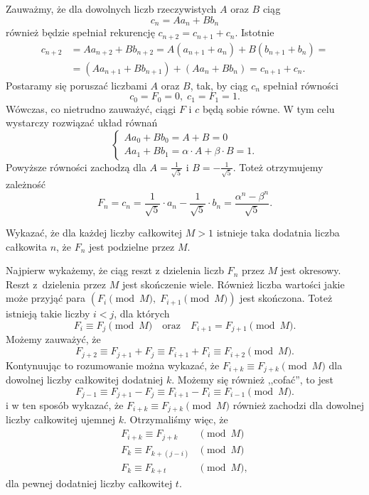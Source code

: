 \vspace{10px}
\noindent
Zauważmy, że dla dowolnych liczb rzeczywistych $A$ oraz $B$ ciąg
\[
	c_n = Aa_n + Bb_n
\]
również będzie spełniał rekurencję $c_{n + 2} = c_{n + 1} + c_n$. Istotnie
\begin{align*}
	c_{n + 2} &= Aa_{n + 2} + Bb_{n + 2} = A(a_{n + 1} + a_n) + B(b_{n + 1} + b_n) = \\
	&= (Aa_{n + 1}  + Bb_{n + 1}) + (Aa_n + Bb_n) = c_{n + 1} + c_n.
\end{align*}
Postaramy się poruszać liczbami $A$ oraz $B$, tak, by ciąg $c_n$ spełniał równości
\[
	c_{0} = F_0 = 0, \; c_{1} = F_1 = 1.
\]
Wówczas, co nietrudno zauważyć, ciągi $F$ i $c$ będą sobie równe. W tym celu wystarczy rozwiązać układ równań
\[
	\begin{cases}
		Aa_0 + Bb_0 = A + B = 0 \\
		Aa_1 + Bb_1 = \alpha \cdot A + \beta \cdot B = 1.
	\end{cases}
\]
Powyższe równości zachodzą dla $A = \frac{1}{\sqrt{5}}$ i $B = -\frac{1}{\sqrt{5}}$. Toteż otrzymujemy zależność
\[
	F_n = c_n = \frac{1}{\sqrt{5}} \cdot a_n - \frac{1}{\sqrt{5}} \cdot b_n = \frac{\alpha^n - \beta^n}{\sqrt{5}}.
\]


\noindent
Wykazać, że dla każdej liczby całkowitej $M > 1$ istnieje taka dodatnia liczba całkowita $n$, że $F_n$ jest podzielne przez $M$.

\vspace{5px}


\noindent
Najpierw wykażemy, że ciąg reszt z dzielenia liczb $F_n$ przez $M$ jest okresowy. Reszt z~dzielenia przez $M$ jest skończenie wiele. Również liczba wartości jakie może przyjąć para $(F_i \pmod{M},\; F_{i + 1}\pmod{M})$ jest skończona. Toteż istnieją takie liczby $i < j$, dla których
\[
	F_i \equiv F_j \pmod{M} \quad \text{oraz} \quad F_{i + 1} = F_{j + 1} \pmod{M}.
\]
Możemy zauważyć, że
\[
	F_{j + 2} \equiv F_{j + 1} + F_j \equiv F_{i + 1} + F_i \equiv F_{i + 2} \pmod{M}.
\]
Kontynuując to rozumowanie można wykazać, że $F_{i + k} \equiv F_{j + k} \pmod{M}$ dla dowolnej liczby całkowitej dodatniej $k$.
Możemy się również ,,cofać'', to jest
\[
	F_{j - 1} \equiv F_{j + 1} - F_j \equiv F_{i + 1} - F_i \equiv F_{i - 1} \pmod{M}.
\]
i w ten sposób wykazać, że $F_{i + k} \equiv F_{j + k} \pmod{M}$ również zachodzi dla dowolnej liczby całkowitej ujemnej $k$. Otrzymaliśmy więc, że
\begin{align*}
	F_{i + k} \equiv F_{j + k} &\pmod{M}\\
	F_{k} \equiv F_{k + (j - i)} &\pmod{M} \\
	F_{k} \equiv F_{k + t} &\pmod{M},
\end{align*}
dla pewnej dodatniej liczby całkowitej $t$.

